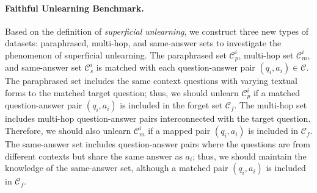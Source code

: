 \paragraph{Faithful Unlearning Benchmark.}
Based on the definition of \textit{superficial unlearning}, we construct three new types of datasets: paraphrased, multi-hop, and same-answer sets to investigate the phenomenon of superficial unlearning.
The paraphrased set $\mathcal{C}_{p}^{i}$, multi-hop set $\mathcal{C}_{m}^{i}$, and same-answer set $\mathcal{C}_{s}^{i}$ is matched with each question-answer pair $(q_{i}, a_{i}) \in \mathcal{C}$.
The paraphrased set includes the same context questions with varying textual forms to the matched target question; thus, we should unlearn $\mathcal{C}_{p}^{i}$ if a matched question-answer pair $(q_{i}, a_{i})$ is included in the forget set $\mathcal{C}_{f}$.
The multi-hop set includes multi-hop question-answer pairs interconnected with the target question. Therefore, we should also unlearn $\mathcal{C}_{m}^{i}$ if a mapped pair $(q_{i}, a_{i})$ is included in $\mathcal{C}_{f}$.
The same-answer set includes question-answer pairs where the questions are from different contexts but share the same answer as $a_{i}$; thus, we should maintain the knowledge of the same-answer set, although a matched pair $(q_{i}, a_{i})$ is included in $\mathcal{C}_{f}$.






